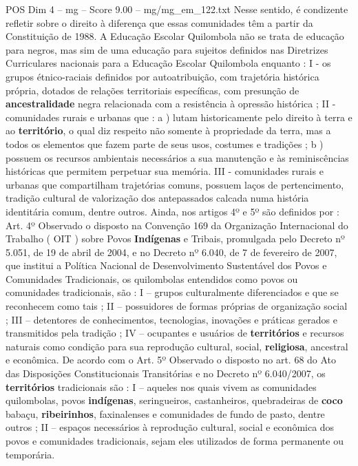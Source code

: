 \begin{textsample}{POS Dim 4 – mg – Score 9.00 – mg/mg\_em\_122.txt}
Nesse sentido, é condizente refletir sobre o direito à diferença que essas comunidades têm a partir da Constituição de 1988.
A Educação Escolar Quilombola não se trata de educação para negros, mas sim de uma educação para sujeitos definidos nas Diretrizes Curriculares nacionais para a Educação Escolar Quilombola enquanto : I - os grupos étnico-raciais definidos por autoatribuição, com trajetória histórica própria, dotados de relações territoriais específicas, com presunção de \textbf{ancestralidade} negra relacionada com a resistência à opressão histórica ; II - comunidades rurais e urbanas que : a ) lutam historicamente pelo direito à terra e ao \textbf{território}, o qual diz respeito não somente à propriedade da terra, mas a todos os elementos que fazem parte de seus usos, costumes e tradições ; b ) possuem os recursos ambientais necessários a sua manutenção e às reminiscências históricas que permitem perpetuar sua memória.
III - comunidades rurais e urbanas que compartilham trajetórias comuns, possuem laços de pertencimento, tradição cultural de valorização dos antepassados calcada numa história identitária comum, dentre outros.
Ainda, nos artigos 4º e 5º são definidos por : Art. 4º Observado o disposto na Convenção 169 da Organização Internacional do Trabalho ( OIT ) sobre Povos \textbf{Indígenas} e Tribais, promulgada pelo Decreto nº 5.051, de 19 de abril de 2004, e no Decreto nº 6.040, de 7 de fevereiro de 2007, que institui a Política Nacional de Desenvolvimento Sustentável dos Povos e Comunidades Tradicionais, os quilombolas entendidos como povos ou comunidades tradicionais, são : I – grupos culturalmente diferenciados e que se reconhecem como tais ; II – possuidores de formas próprias de organização social ; III – detentores de conhecimentos, tecnologias, inovações e práticas gerados e transmitidos pela tradição ; IV – ocupantes e usuários de \textbf{territórios} e recursos naturais como condição para sua reprodução cultural, social, \textbf{religiosa}, ancestral e econômica.
De acordo com o Art. 5º Observado o disposto no art. 68 do Ato das Disposições Constitucionais Transitórias e no Decreto nº 6.040/2007, os \textbf{territórios} tradicionais são : I – aqueles nos quais vivem as comunidades quilombolas, povos \textbf{indígenas}, seringueiros, castanheiros, quebradeiras de \textbf{coco} babaçu, \textbf{ribeirinhos}, faxinalenses e comunidades de fundo de pasto, dentre outros ; II – espaços necessários à reprodução cultural, social e econômica dos povos e comunidades tradicionais, sejam eles utilizados de forma permanente ou temporária.

\end{textsample}
